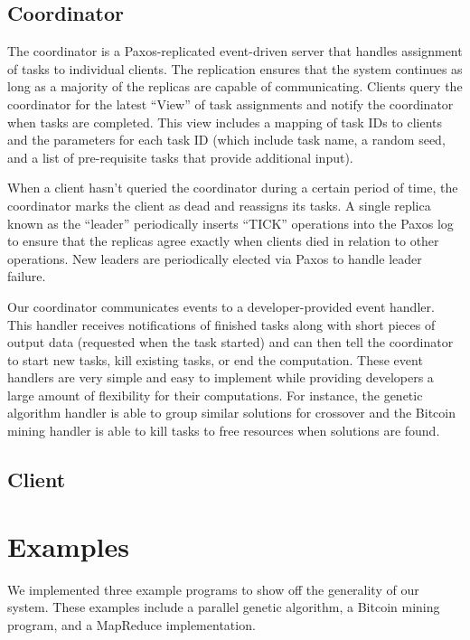 \documentclass [11pt, twocolumn] {article}
\begin{document}
\subsection {Coordinator} 

The coordinator is a Paxos-replicated event-driven server that handles assignment of tasks to individual clients. The replication ensures that the system continues as long as a majority of the replicas are capable of communicating. Clients query the coordinator for the latest ``View'' of task assignments and notify the coordinator when tasks are completed. This view includes a mapping of task IDs to clients and the parameters for each task ID (which include task name, a random seed, and a list of pre-requisite tasks that provide additional input). 

When a client hasn't queried the coordinator during a certain period of time, the coordinator marks the client as dead and reassigns its tasks. A single replica known as the ``leader'' periodically inserts ``TICK'' operations into the Paxos log to ensure that the replicas agree exactly when clients died in relation to other operations. New leaders are periodically elected via Paxos to handle leader failure. 

Our coordinator communicates events to a developer-provided event handler. This handler receives notifications of finished tasks along with short pieces of output data (requested when the task started) and can then tell the coordinator to start new tasks, kill existing tasks, or end the computation. These event handlers are very simple and easy to implement while providing developers a large amount of flexibility for their computations. For instance, the genetic algorithm handler is able to group similar solutions for crossover and the Bitcoin mining handler is able to kill tasks to free resources when solutions are found. 

\subsection {Client} 

\section {Examples}

We implemented three example programs to show off the generality of our system. These examples include a parallel genetic algorithm, a Bitcoin mining program, and a MapReduce implementation. 
\end{document}
